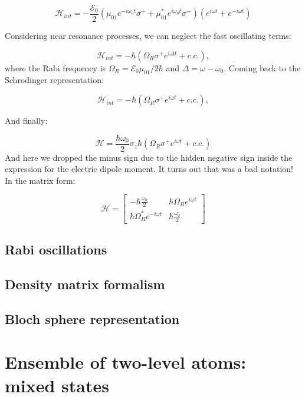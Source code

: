 \documentclass[letterpaper, 12pt]{article}
\begin{document}
\begin{equation}
    \mathcal{H}_{int} = - \frac{\mathcal{E}_{0}}{2} (\mu _{01} e^{-i \omega_{0} t}\sigma^{+} + \mu _{01}^{*} e^{i \omega_{0} t}\sigma^{-}) ( e^{i \omega t} + e^{ - i \omega t})
\end{equation}

Considering near resonance processes, we can neglect the fast oscillating terms:

\begin{equation}
    \mathcal{H}_{int} = - \hbar( \Omega_{R} \sigma^{+} e^{i \Delta t} + c.c.),
\end{equation}
where the Rabi frequency is $\Omega_{R} = \mathcal{E}_{0} \mu_{01} / 2\hbar$ and $\Delta = \omega - \omega_{0}$. Coming back to the Schrodinger representation:

\begin{equation}
    \mathcal{H}_{int} = - \hbar( \Omega_{R} \sigma^{+} e^{i \omega t} + c.c.),
\end{equation}

And finally;

\begin{equation}
    \mathcal{H} = \frac {\hbar \omega_{0}}{2} \sigma_{z}  \hbar( \Omega_{R} \sigma^{+} e^{i \omega t} + c.c.)
\end{equation}
And here we dropped the minus sign due to the hidden negative sign inside the expression for the electric dipole moment. It turns out that was a bad notation!
In the matrix form:

\[
\mathcal{H} =
  \begin{bmatrix}
    -\hbar \frac {\omega_{0}}{2} & \hbar \Omega_{R}  e^{i \omega t}  \\
    \hbar \Omega_{R}^{*}  e^{-i \omega t} & \hbar \frac {\omega_{0}}{2}
  \end{bmatrix}
\]

\subsection{Rabi oscillations}

\subsection{Density matrix formalism}

\subsection{Bloch sphere representation}

\section{Ensemble of two-level atoms: mixed states}
\end{document}

